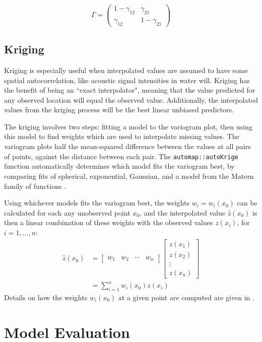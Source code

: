 \documentclass[12pt]{article}
\begin{document}
	\[\Gamma = \begin{pmatrix} 1 - \gamma_{12} & \gamma_{21} \\ \gamma_{12} & 1 - \gamma_{21} \end{pmatrix}\]
	
	\subsection{Kriging}
	
	Kriging is especially useful when interpolated values are assumed to have some spatial autocorrelation, like acoustic signal intensities in water will. Kriging has the benefit of being an ``exact interpolator", meaning that the value predicted for any observed location will equal the observed value. Additionally, the interpolated values from the kriging process will be the best linear unbiased predictors.
	
	The kriging involves two steps: fitting a model to the variogram plot, then using this model to find weights which are used to interpolate missing values. The variogram plots half the mean-squared difference between the values at all pairs of points, against the distance between each pair. The \texttt{automap::autoKrige} function automatically determines which model fits the variogram best, by comparing fits of spherical, exponential, Gaussian, and a model from the Matern family of functions \cite{Hiemstra2008}. 
	
	Using whichever models fits the variogram best, the weights $w_i = w_i(x_0)$ can be calculated for each any unobserved point $x_0$, and the interpolated value $\hat z(x_0)$ is then a linear combination of these weights with the observed values $z(x_i)$, for $i = 1, \ldots, n$:
	\begin{align*}
		\hat z(x_0) &= \begin{bmatrix} w_1 & w_2 & \cdots & w_n \end{bmatrix} \begin{bmatrix} z(x_1) \\ z(x_2) \\ \vdots \\ z(x_n) \end{bmatrix} \\
		&= \sum_{i = 1}^n w_i(x_0) z(x_i)
	\end{align*}
	Details on how the weights $w_i(x_0)$ at a given point are computed are given in \cite{Bailey1995}.
	
	\section{Model Evaluation}
	
\end{document}
